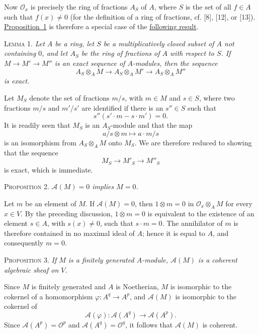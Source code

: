 Now $\mathcal{O}_x$ is precisely the ring of fractions $A_S$ of $A$, where
$S$ is the set of all $f\in A$ such that $f(x)\ne0$ (for the definition of a
ring of fractions, cf. [8], [12], or [13]). \hyperref[fac:II:4:prop:1]{Proposition~1} is therefore a
special case of the \hyperref[fac:II:4:lemma:1]{following result}.

\label{fac:II:4:lemma:1}
\textsc{Lemma 1.} \textit{Let $A$ be a ring, let $S$ be a multiplicatively
closed subset of $A$ not containing $0$, and let $A_S$ be the ring of
fractions of $A$ with respect to $S$. If $M\to M'\to M''$ is an exact
sequence of $A$-modules, then the sequence
\[
A_S\otimes_A M\longrightarrow A_S\otimes_A M'
\longrightarrow A_S\otimes_A M''
\]
is exact.}

Let $M_S$ denote the set of fractions $m/s$, with $m\in M$ and $s\in S$,
where two fractions $m/s$ and $m'/s'$ are identified if there is an
$s''\in S$ such that
\[
s''(s'\cdot m-s\cdot m')=0.
\]
It is readily seen that $M_S$ is an $A_S$-module and that the map
\[
a/s\otimes m\longmapsto a\cdot m/s
\]
is an isomorphism from $A_S\otimes_A M$ onto $M_S$. We are therefore reduced
to showing that the sequence
\[
M_S\longrightarrow M'_S\longrightarrow M''_S
\]
is exact, which is immediate.

\label{fac:II:4:prop:2}
\textsc{Proposition 2.} \textit{$\mathcal{A}(M)=0$ implies $M=0$.}

Let $m$ be an element of $M$. If $\mathcal{A}(M)=0$, then
$1\otimes m=0$ in $\mathcal{O}_x\otimes_A M$ for every $x\in V$. By the
preceding discussion, $1\otimes m=0$ is equivalent to the existence of an
  element $s\in A$, with $s(x)\ne0$, such that $s\cdot m=0$.
  The annihilator of $m$ is therefore contained in no maximal ideal of $A$; hence it is
equal to $A$, and consequently $m=0$.

\label{fac:II:4:prop:3}
\textsc{Proposition 3.} \textit{If $M$ is a finitely generated $A$-module,
$\mathcal{A}(M)$ is a coherent algebraic sheaf on $V$.}

Since $M$ is finitely generated and $A$ is Noetherian, $M$ is isomorphic to
the cokernel of a homomorphism $\varphi:A^q\to A^p$, and
$\mathcal{A}(M)$ is isomorphic to the cokernel of
\[
\mathcal{A}(\varphi):\mathcal{A}(A^q)\longrightarrow\mathcal{A}(A^p).
\]
Since $\mathcal{A}(A^p)=\mathcal{O}^p$ and
$\mathcal{A}(A^q)=\mathcal{O}^q$, it follows that $\mathcal{A}(M)$ is
coherent.
